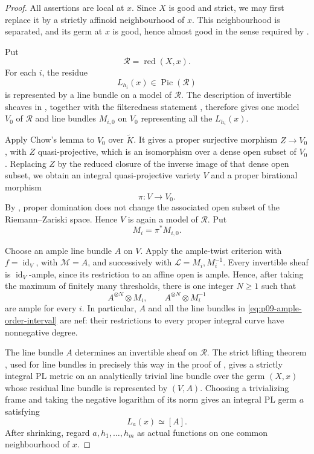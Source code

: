 \begin{proof}
All assertions are local at \(x\).  Since \(X\) is good and strict, we
may first replace it by a strictly affinoid neighbourhood of \(x\).
This neighbourhood is separated, and its germ at \(x\) is good, hence
almost good in the sense required by
\cite[Theorem~17.5.7(b)]{CLD25}.

Put
\[
                         \mathscr R=\operatorname{red}(X,x).
\]
For each \(i\), the residue
\[
                         L_{h_i}(x)\in\operatorname{Pic}(\mathscr R)
\]
is represented by a line bundle on a model of \(\mathscr R\).  The
description of invertible sheaves in \cite[\S6.6]{GJR26}, together with
the filteredness statement \cite[Lemma~6.5]{GJR26}, therefore gives one
model \(V_0\) of \(\mathscr R\) and line bundles \(M_{i,0}\) on \(V_0\)
representing all the \(L_{h_i}(x)\).

Apply Chow's lemma \cite[Tag~02O2]{stacks-project} to \(V_0\) over
\(\widetilde K\).  It gives a proper surjective morphism
\(Z\to V_0\), with \(Z\) quasi-projective, which is an isomorphism over
a dense open subset of \(V_0\).  Replacing \(Z\) by the reduced closure
of the inverse image of that dense open subset, we obtain an integral
quasi-projective variety \(V\) and a proper birational morphism
\[
                             \pi:V\longrightarrow V_0.
\]
By \cite[\S6.2]{GJR26}, proper domination does not change the associated
open subset of the Riemann--Zariski space.  Hence \(V\) is again a model
of \(\mathscr R\).  Put
\[
                             M_i=\pi^*M_{i,0}.
\]

Choose an ample line bundle \(A\) on \(V\).  Apply the ample-twist criterion
\cite[Tag~0892]{stacks-project} with \(f=\operatorname{id}_V\), with
\(\mathcal M=A\), and successively with
\(\mathcal L=M_i,M_i^{-1}\).  Every invertible sheaf is
\(\operatorname{id}_V\)-ample, since its restriction to an affine open is
ample.  Hence, after taking the maximum of finitely many thresholds, there
is one integer \(N\geq1\) such that
\begin{equation}
\label{eq:p09-ample-order-interval}
                A^{\otimes N}\otimes M_i,
                \qquad
                A^{\otimes N}\otimes M_i^{-1}
\end{equation}
are ample for every \(i\).  In particular, \(A\) and all the line
bundles in \eqref{eq:p09-ample-order-interval} are nef: their restrictions
to every proper integral curve have nonnegative degree.

The line bundle \(A\) determines an invertible sheaf on
\(\mathscr R\).  The strict lifting theorem
\cite[Theorem~17.5.7(b)]{CLD25}, used for line bundles in precisely this
way in the proof of \cite[Proposition~7.10]{GJR26}, gives a strictly
integral PL metric on an analytically trivial line bundle over the germ
\((X,x)\) whose residual line bundle is represented by \((V,A)\).
Choosing a trivializing frame and taking the negative logarithm of its
norm gives an integral PL germ \(a\) satisfying
\[
                             L_a(x)\simeq[A].
\]
After shrinking, regard \(a,h_1,\ldots,h_m\) as actual functions on one
common neighbourhood of \(x\).


\end{proof}

